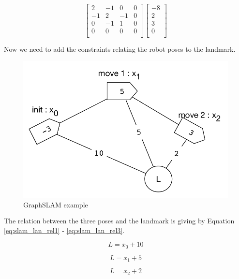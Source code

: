 \begin{equation}
\label{eq:slam_matrix2}
\begin{bmatrix}
2 & -1 & 0 & 0 \\
-1 & 2 & -1 & 0 \\
0 & -1 & 1 & 0 \\
0 & 0 & 0 & 0 \\
\end{bmatrix}
\begin{bmatrix}
-8 \\
2 \\
3 \\
0 \\
\end{bmatrix}
\end{equation}

Now we need to add the constraints relating the robot poses to the landmark.

\begin{figure}[H]
\centering
\includegraphics[scale=0.70]{images/ex_slam_graph}
\caption{GraphSLAM example}
\label{fig:slam_ex}
\end{figure}

The relation between the three poses and the landmark is giving by Equation \ref{eq:slam_lan_rel1} - \ref{eq:slam_lan_rel3}.

\begin{equation}
\label{eq:slam_lan_rel1}
L = x_0 + 10
\end{equation}

\begin{equation}
\label{eq:slam_lan_rel2}
L = x_1 + 5
\end{equation}

\begin{equation}
\label{eq:slam_lan_rel3}
L = x_2 + 2
\end{equation}

